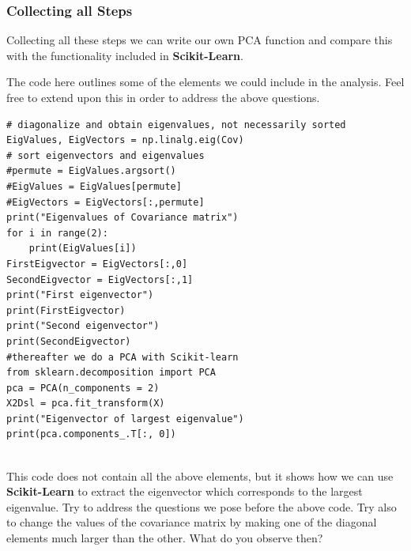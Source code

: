 \documentclass{beamer}
\begin{document}
\begin{frame}
\frametitle{Collecting all Steps}

Collecting all these steps we can write our own PCA function and
compare this with the functionality included in \textbf{Scikit-Learn}.  

The code here outlines some of the elements we could include in the
analysis. Feel free to extend upon this in order to address the above
questions.
























\begin{verbatim}
# diagonalize and obtain eigenvalues, not necessarily sorted
EigValues, EigVectors = np.linalg.eig(Cov)
# sort eigenvectors and eigenvalues
#permute = EigValues.argsort()
#EigValues = EigValues[permute]
#EigVectors = EigVectors[:,permute]
print("Eigenvalues of Covariance matrix")
for i in range(2):
    print(EigValues[i])
FirstEigvector = EigVectors[:,0]
SecondEigvector = EigVectors[:,1]
print("First eigenvector")
print(FirstEigvector)
print("Second eigenvector")
print(SecondEigvector)
#thereafter we do a PCA with Scikit-learn
from sklearn.decomposition import PCA
pca = PCA(n_components = 2)
X2Dsl = pca.fit_transform(X)
print("Eigenvector of largest eigenvalue")
print(pca.components_.T[:, 0])


\end{verbatim}

This code does not contain all the above elements, but it shows how we can use \textbf{Scikit-Learn} to extract the eigenvector which corresponds to the largest eigenvalue. Try to address the questions we pose before the above code.  Try also to change the values of the covariance matrix by making one of the diagonal elements much larger than the other. What do you observe then?
\end{frame}
\end{document}
